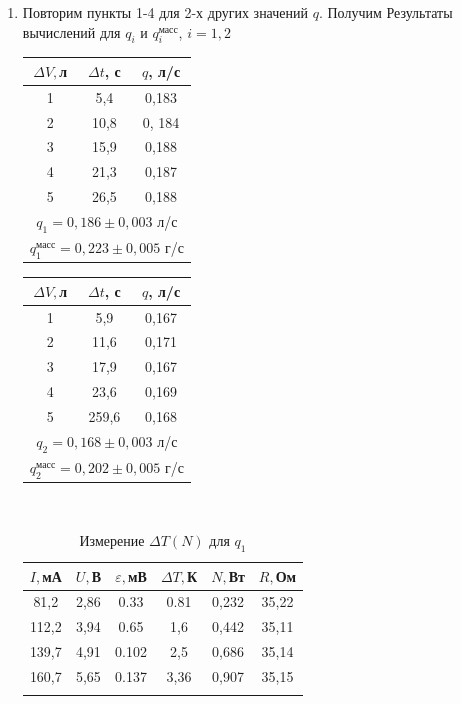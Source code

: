 \documentclass[a4paper, 12pt]{article}%
\begin{document}
\begin{enumerate}
	\item Повторим пункты 1-4 для 2-х других значений $q$. Получим Результаты вычислений для $q_i$ и $q_i^{\text{масс}}$, $i = 1, 2$

	\begin{minipage}{0.4\textwidth}
\begin{longtable}{|c|c|c|}
	\hline
	$ \Delta V, $л & $ \Delta t $, с & $ q $, л/с  \\ \hline
	1 & 5,4 & 0,183  \\ \hline
	2 & 10,8& 0, 184 \\ \hline
	3 & 15,9 & 0,188 \\ \hline
	4 & 21,3 & 0,187 \\ \hline
	5 &  26,5 & 0,188 \\ \hline
	\multicolumn{3}{|c|}{$q_1 = 0,186 \pm 0,003$ л/с}  \\ \hline
	\multicolumn{3}{|c|}{$q_1^{\text{масс}} = 0, 223 \pm 0,005$ г/с}  \\ \hline
\end{longtable}
\end{minipage} 
\begin{minipage}{0.4\textwidth}
	\begin{longtable}{|c|c|c|}
		\hline
		$ \Delta V, $л & $ \Delta t $, с & $ q $, л/с  \\ \hline
		1 & 5,9 & 0,167  \\ \hline
		2 & 11,6& 0,171 \\ \hline
		3 & 17,9 & 0,167 \\ \hline
		4 & 23,6 & 0,169 \\ \hline
		5 &  259,6 & 0,168 \\ \hline
		\multicolumn{3}{|c|}{$q_2 = 0,168 \pm 0,003$ л/с}  \\ \hline
		\multicolumn{3}{|c|}{$q_2^{\text{масс}} = 0, 202 \pm 0,005$ г/с}  \\ \hline
	\end{longtable}
\end{minipage} \\

	
	\newpage
	
\begin{longtable}{|c|c|c|c|c|c|}
	\hline
	$I, $мА & $U, $В &$\varepsilon, $мВ & $ \Delta T, $К & $N, $Вт &  $R, $Ом 
	\\
	\hline
	81,2 & 2,86 & 0.33 & 0.81 & 0,232 & 35,22
	\\
	\hline
	112,2 & 3,94 & 0.65 & 1,6 & 0,442 & 35,11
	\\
	\hline
	139,7 & 4,91 & 0.102 & 2,5 & 0,686 & 35,14
	\\
	\hline
	160,7 & 5,65 & 0.137 & 3,36 & 0,907 & 35,15
	\\
	\hline
\caption{Измерение $\Delta T (N)$ для $ q_1$}
\end{longtable}


\end{enumerate}
\end{document}
